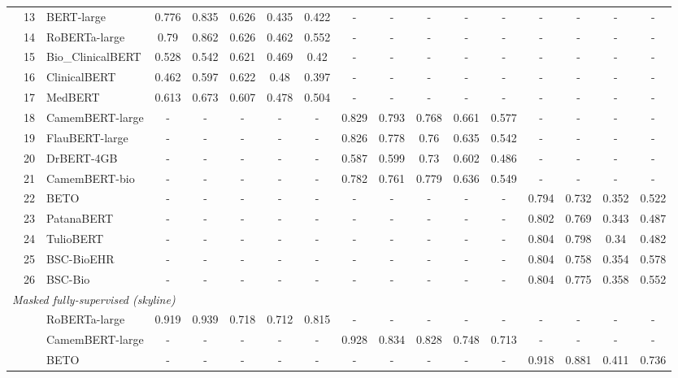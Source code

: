{\begin{tabular}{lll|ccccc|ccccc|cccc}
 & 13 & BERT-large & 0.776 & 0.835 & 0.626 & 0.435 & 0.422 & - & - & - & - & - & - & - & - & - \\
 & 14 & RoBERTa-large & 0.79 & 0.862 & 0.626 & 0.462 & 0.552 & - & - & - & - & - & - & - & - & - \\
 & 15 & Bio\_ClinicalBERT & 0.528 & 0.542 & 0.621 & 0.469 & 0.42 & - & - & - & - & - & - & - & - & - \\
 & 16 & ClinicalBERT & 0.462 & 0.597 & 0.622 & 0.48 & 0.397 & - & - & - & - & - & - & - & - & - \\
 & 17 & MedBERT & 0.613 & 0.673 & 0.607 & 0.478 & 0.504 & - & - & - & - & - & - & - & - & - \\
 & 18 & CamemBERT-large & - & - & - & - & - & 0.829 & 0.793 & 0.768 & 0.661 & 0.577 & - & - & - & - \\
 & 19 & FlauBERT-large & - & - & - & - & - & 0.826 & 0.778 & 0.76 & 0.635 & 0.542 & - & - & - & - \\
 & 20 & DrBERT-4GB & - & - & - & - & - & 0.587 & 0.599 & 0.73 & 0.602 & 0.486 & - & - & - & - \\
 & 21 & CamemBERT-bio & - & - & - & - & - & 0.782 & 0.761 & 0.779 & 0.636 & 0.549 & - & - & - & - \\
 & 22 & BETO & - & - & - & - & - & - & - & - & - & - & 0.794 & 0.732 & 0.352 & 0.522 \\
 & 23 & PatanaBERT & - & - & - & - & - & - & - & - & - & - & 0.802 & 0.769 & 0.343 & 0.487 \\
 & 24 & TulioBERT & - & - & - & - & - & - & - & - & - & - & 0.804 & 0.798 & 0.34 & 0.482 \\
 & 25 & BSC-BioEHR & - & - & - & - & - & - & - & - & - & - & 0.804 & 0.758 & 0.354 & 0.578 \\
 & 26 & BSC-Bio & - & - & - & - & - & - & - & - & - & - & 0.804 & 0.775 & 0.358 & 0.552 \\
\midrule
\midrule
\multicolumn{17}{l}{\textit{Masked fully-supervised (skyline)}} \\
\midrule
 & & RoBERTa-large & 0.919 & 0.939 & 0.718 & 0.712 & 0.815 & - & - & - & - & - & - & - & - & - \\
 & & CamemBERT-large & - & - & - & - & - & 0.928 & 0.834 & 0.828 & 0.748 & 0.713 & - & - & - & - \\
 & & BETO & - & - & - & - & - & - & - & - & - & - & 0.918 & 0.881 & 0.411 & 0.736 \\
\bottomrule
\end{tabular}}